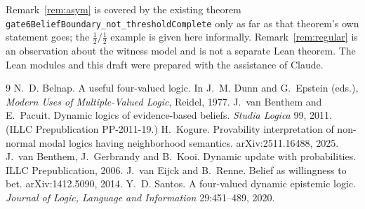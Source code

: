 \documentclass[11pt,a4paper]{article}
\theoremstyle{definition}
\theoremstyle{remark}
\newcommand{\lean}[1]{\texttt{\small #1}}
\begin{document}
\medskip
\sloppy\noindent Remark~\ref{rem:asym} is covered by the existing theorem
\lean{gate6BeliefBoundary\_not\_thresholdComplete} only as far as that theorem's own
statement goes; the $\tfrac12/\tfrac12$ example is given here informally.
Remark~\ref{rem:regular} is an observation about the witness model and is not a separate
Lean theorem. The Lean modules and this draft were prepared with the assistance of Claude.

\begin{thebibliography}{9}
 N.~D. Belnap. A useful four-valued logic. In J.~M. Dunn and
G.~Epstein (eds.), \emph{Modern Uses of Multiple-Valued Logic}, Reidel, 1977.
 J.~van Benthem and E.~Pacuit. Dynamic logics of evidence-based beliefs.
\emph{Studia Logica} 99, 2011. (ILLC Prepublication PP-2011-19.)
 H.~Kogure. Provability interpretation of non-normal modal logics
having neighborhood semantics. arXiv:2511.16488, 2025.
 J.~van Benthem, J.~Gerbrandy and B.~Kooi. Dynamic update with
probabilities. ILLC Prepublication, 2006.
 J.~van Eijck and B.~Renne. Belief as willingness to bet.
arXiv:1412.5090, 2014.
 Y.~D. Santos. A four-valued dynamic epistemic logic.
\emph{Journal of Logic, Language and Information} 29:451--489, 2020.
\end{thebibliography}
\end{document}

